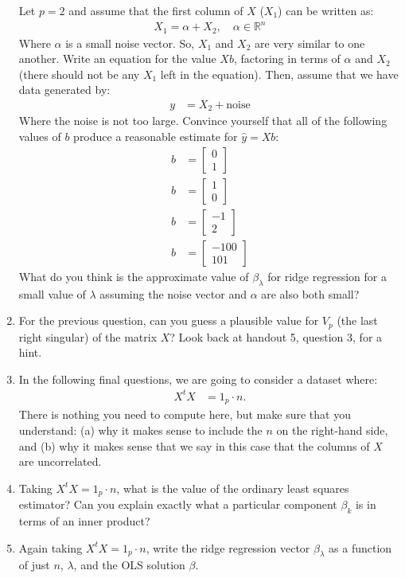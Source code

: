 \documentclass[12pt,hidelinks]{article}
\numberwithin{equation}{section}
\begin{document}
\begin{enumerate}
Let $p=2$ and assume that the first column of $X$ ($X_1$) can be written as:
\begin{align}
X_1 = \alpha + X_2, \quad \alpha \in \mathbb{R}^n
\end{align}
Where $\alpha$ is a small noise vector. So, $X_1$ and $X_2$ are very similar to
one another. Write an equation for the value $X b$, factoring in terms of $\alpha$
and $X_2$ (there should not be any $X_1$ left in the equation). Then, assume that
we have data generated by:
\begin{align}
y &= X_2 + \text{noise}
\end{align}
Where the noise is not too large. Convince yourself that all of the following
values of $b$ produce a reasonable estimate for $\widehat{y} = X b$:
\begin{align}
b &= \begin{bmatrix} 0 \\ 1 \end{bmatrix} \\
b &= \begin{bmatrix} 1 \\ 0 \end{bmatrix} \\
b &= \begin{bmatrix} -1 \\ 2 \end{bmatrix} \\
b &= \begin{bmatrix} -100 \\ 101 \end{bmatrix}
\end{align}
What do you think is the approximate value of $\beta_\lambda$ for ridge
regression for a small value of $\lambda$ assuming the noise vector and $\alpha$
are also both small?
\item For the previous question, can you guess a plausible value for $V_p$
(the last right singular) of the matrix $X$? Look back at handout 5, question 3,
for a hint.
\item In the following final questions, we are going to consider a dataset
where:
\begin{align}
X^t X &= 1_p \cdot n.
\end{align}
There is nothing you need to compute here, but make sure that you understand:
(a) why it makes sense to include the $n$ on the right-hand side, and (b) why
it makes sense that we say in this case that the columns of $X$ are uncorrelated.
\item Taking $X^t X = 1_p \cdot n$, what is the value of the ordinary least
squares estimator? Can you explain exactly what a particular component $\beta_k$
is in terms of an inner product?
\item Again taking $X^t X = 1_p \cdot n$, write the ridge regression vector
$\beta_\lambda$ as a function of just $n$, $\lambda$, and the OLS solution $\beta$.
\end{enumerate}
\end{document}
